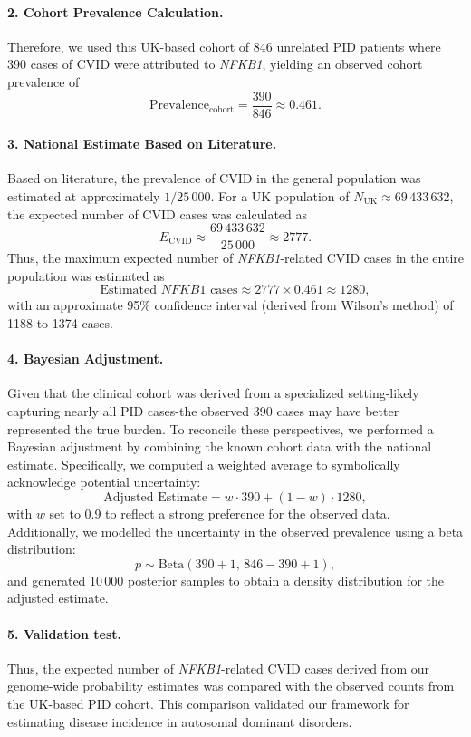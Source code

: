 \paragraph{2. Cohort Prevalence Calculation.}
Therefore, we used this UK-based cohort of 846 unrelated PID patients where 390 cases of CVID were attributed to \textit{NFKB1}, yielding an observed cohort prevalence of
\[
\text{Prevalence}_{\text{cohort}} = \frac{390}{846} \approx 0.461.
\]

\paragraph{3. National Estimate Based on Literature.}
Based on literature, the prevalence of CVID in the general population was estimated at approximately \(1/25\,000\). For a UK population of \(N_{\text{UK}} \approx 69\,433\,632\), the expected number of CVID cases was calculated as
\[
E_{\text{CVID}} \approx \frac{69\,433\,632}{25\,000} \approx 2777.
\]
Thus, the maximum expected number of \textit{NFKB1}-related CVID cases in the entire population was estimated as
\[
\text{Estimated } NFKB1 \text{ cases} \approx 2777 \times 0.461 \approx 1280,
\]
with an approximate 95\% confidence interval (derived from Wilson’s method) of 1188 to 1374 cases.

\paragraph{4. Bayesian Adjustment.}
Given that the clinical cohort was derived from a specialized setting-likely capturing nearly all PID cases-the observed 390 cases may have better represented the true burden. To reconcile these perspectives, we performed a Bayesian adjustment by combining the known cohort data with the national estimate. Specifically, we computed a weighted average to symbolically acknowledge potential uncertainty:
\[
\text{Adjusted Estimate} = w \cdot 390 + (1 - w) \cdot 1280,
\]
with \(w\) set to 0.9 to reflect a strong preference for the observed data.
Additionally, we modelled the uncertainty in the observed prevalence using a beta distribution:
\[
p \sim \mathrm{Beta}(390+1,\,846-390+1),
\]
and generated 10\,000 posterior samples to obtain a density distribution for the adjusted estimate.

\paragraph{5. Validation test.}
Thus, the expected number of \textit{NFKB1}-related CVID cases derived from our genome-wide probability estimates was compared with the observed counts from the UK-based PID cohort. This comparison validated our framework for estimating disease incidence in autosomal dominant disorders.

